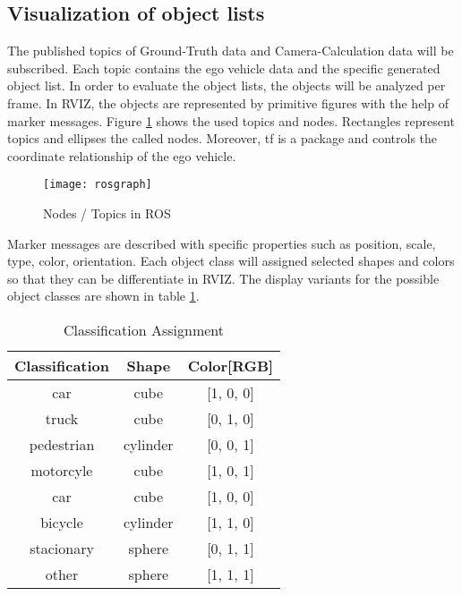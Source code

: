 \subsection{Visualization of object lists}




The published topics of Ground-Truth data and Camera-Calculation data will be subscribed. Each topic contains the ego vehicle data and the specific generated object list. In order to evaluate the object lists, the objects will be analyzed per frame. In RVIZ, the objects are represented by primitive figures with the help of marker messages. Figure \ref{fig:Nodes} shows the used topics and nodes. Rectangles represent topics and ellipses the called nodes. Moreover, tf is a package and controls the coordinate relationship of the ego vehicle.

\begin{figure}[thpb]
	\centering
	\texttt{[image: rosgraph]}
	\caption{Nodes / Topics in ROS}
	\label{fig:Nodes}
\end{figure}



Marker messages are described with specific properties such as position, scale, type, color, orientation. Each object class will assigned selected shapes and colors so that they can be differentiate in RVIZ. The display variants for the possible object classes are shown in table \ref{ClassificationAssignment}. 

\begin{table}[h]
\caption{Classification Assignment}
\label{ClassificationAssignment}
\begin{center}
\begin{tabular}{c c c}
\hline
Classification & Shape & Color[RGB]\\
\hline
car & cube & [1, 0, 0]\\
truck & cube & [0, 1, 0]\\
pedestrian & cylinder & [0, 0, 1]\\
motorcyle & cube & [1, 0, 1]\\
car & cube & [1, 0, 0]\\
bicycle & cylinder & [1, 1, 0]\\
stacionary & sphere & [0, 1, 1]\\
other & sphere & [1, 1, 1]\\
\hline


\end{tabular}
\end{center}
\end{table}

